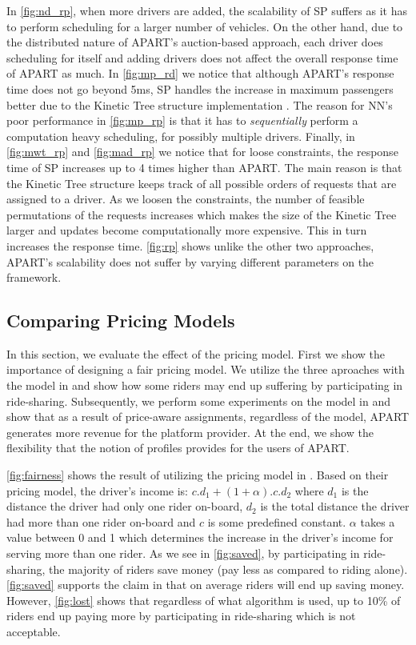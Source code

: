 In \cref{fig:nd_rp}, when more drivers are added, the scalability of SP suffers as it has to perform scheduling for a larger number of vehicles. On the other hand, due to the distributed nature of APART's auction-based approach, each driver does scheduling for itself and adding drivers does not affect the overall response time of APART as much. In \cref{fig:mp_rd} we notice that although APART's response time does not go beyond 5ms, SP handles the increase in maximum passengers better due to the Kinetic Tree structure implementation \cite{Huang14}. The reason for NN's poor performance in \cref{fig:mp_rp} is that it has to \textit{sequentially} perform a computation heavy scheduling, for possibly multiple drivers. Finally, in \cref{fig:mwt_rp} and \cref{fig:mad_rp} we notice that for loose constraints, the response time of SP increases up to 4 times higher than APART. The main reason is that the Kinetic Tree structure keeps track of all possible orders of requests that are assigned to a driver. As we loosen the constraints, the number of feasible permutations of the requests increases which makes the size of the Kinetic Tree larger and updates become computationally more expensive. This in turn increases the response time. \cref{fig:rp} shows unlike the other two approaches, APART's scalability does not suffer by varying different parameters on the framework.

\subsection{Comparing Pricing Models}
\label{subsec:pricingexp}

In this section, we evaluate the effect of the pricing model. First we show the importance of designing a fair pricing model. We utilize the three aproaches with the model in \cite{Ma13} and show how some riders may end up suffering by participating in ride-sharing. Subsequently, we perform some experiments on the model in \cite{Ma15} and show that as a result of price-aware assignments, regardless of the model, APART generates more revenue for the platform provider. At the end, we show the flexibility that the notion of profiles provides for the users of APART. 

\cref{fig:fairness} shows the result of utilizing the pricing model in \cite{Ma13}. Based on their pricing model, the driver's income is: $c.d_1 + (1+\alpha).c.d_2$ where $d_1$ is the distance the driver had only one rider on-board, $d_2$ is the total distance the driver had more than one rider on-board and $c$ is some predefined constant. $\alpha$ takes a value between 0 and 1 which determines the increase in the driver's income for serving more than one rider. As we see in \cref{fig:saved}, by participating in ride-sharing, the majority of riders save money (pay less as compared to riding alone). \cref{fig:saved} supports the claim in \cite{Ma13} that on average riders will end up saving money. However, \cref{fig:lost} shows that regardless of what algorithm is used, up to 10\% of riders end up paying more by participating in ride-sharing which is not acceptable. 

